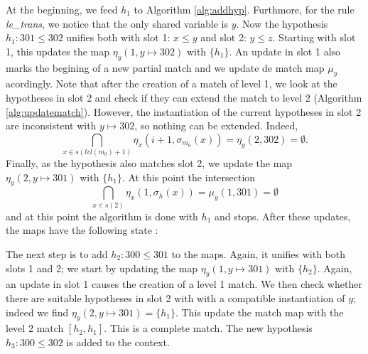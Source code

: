 \documentclass[runningheads]{llncs}
\begin{document}
At the beginning, we feed $h_1$ to Algorithm \ref{alg:addhyp}.
Furthmore, for the rule \textit{le\_trans}, we notice that the only shared variable is ${y}$.
Now the hypothesis $h_1 : 301 \leq 302$ unifies both with slot 1: $x \leq y$ and slot 2: $y \leq z$.
Starting with slot 1, this updates the map $\eta_y(1, y \mapsto 302)$ with $\{h_1\}$.
An update in slot 1 also marks the begining of a new partial match and we update de match map $\mu_y$ acordingly.
Note that after the creation of a match of level 1, we look at the hypotheses in slot 2 and check if they can extend the match to level 2 (Algorithm \ref{alg:updatematch}). However, the instantiation of the current hypotheses in slot 2 are inconsistent with $y \mapsto 302$, so nothing can be extended. Indeed, 
\[
  \bigcap_{x\in s(lvl(m_0) + 1)} \eta_x \left(i + 1, \sigma_{m_0}(x)\right) = \eta_y(2, 302) = \emptyset.
\]
Finally, as the hypothesis also matches slot 2, we update the map $\eta_y(2, y \mapsto 301)$ with $\{h_1\}$.
At this point the intersection
\[
  \bigcap_{x\in s(2)} \eta_x \left(1, \sigma_{h}(x)\right) = \mu_y(1, 301) = \emptyset
\]
and at this point the algorithm is done with $h_1$ and stops.
After these updates, the maps have the following state :

\begin{center}
\end{center}

The next step is to add $h_2 : 300 \leq 301$ to the maps.
Again, it unifies with both slots 1 and 2; we start by updating the map $\eta_y(1, y \mapsto 301)$ with $\{h_2\}$.
Again, an update in slot 1 causes the creation of a level 1 match.
We then check whether there are suitable hypotheses in slot 2 with
with a compatible instantiation of $y$; indeed we find $\eta_y(2, y \mapsto 301) = \{h_1\}$.
This update the match map with the level 2 match $[h_2,h_1]$.
This is a complete match.
The new hypothesis $h_3 : 300 \leq 302$ is added to the context.
\end{document}

